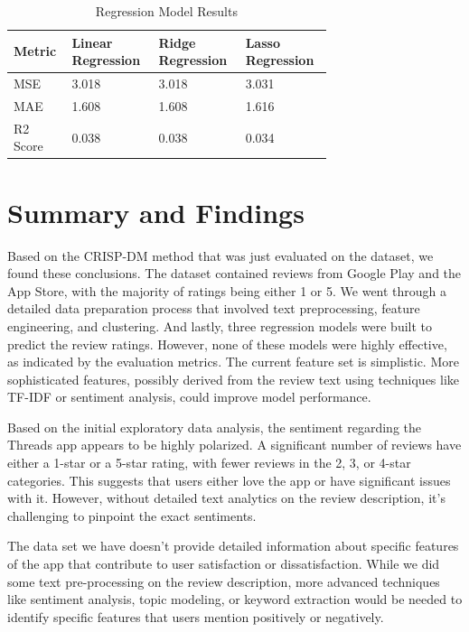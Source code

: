 \documentclass[
	a4paper, %
	10pt, %
	unnumberedsections, %
	twoside, %
]{LTJournalArticle}
\begin{document}
\begin{table} %
	\caption{Regression Model Results}
	\centering %
	\begin{tabular}{L{0.10\linewidth} R{0.2\linewidth} R{0.2\linewidth} R{0.2\linewidth}} %
		\toprule
		Metric & Linear Regression & Ridge Regression & Lasso Regression \\
		\midrule
		MSE & 3.018 & 3.018 & 3.031\\
         MAE & 1.608 & 1.608 & 1.616 \\
         R2 Score & 0.038 & 0.038 & 0.034\\
		\bottomrule
	\end{tabular}
\end{table}

\section{Summary and Findings}

Based on the CRISP-DM method that was just evaluated on the dataset, we found these conclusions. The dataset contained reviews from Google Play and the App Store, with the majority of ratings being either 1 or 5. We went through a detailed data preparation process that involved text preprocessing, feature engineering, and clustering. And lastly, three regression models were built to predict the review ratings. However, none of these models were highly effective, as indicated by the evaluation metrics. The current feature set is simplistic. More sophisticated features, possibly derived from the review text using techniques like TF-IDF or sentiment analysis, could improve model performance.

Based on the initial exploratory data analysis, the sentiment regarding the Threads app appears to be highly polarized. A significant number of reviews have either a 1-star or a 5-star rating, with fewer reviews in the 2, 3, or 4-star categories. This suggests that users either love the app or have significant issues with it. However, without detailed text analytics on the review description, it's challenging to pinpoint the exact sentiments.

The data set we have doesn't provide detailed information about specific features of the app that contribute to user satisfaction or dissatisfaction. While we did some text pre-processing on the review description, more advanced techniques like sentiment analysis, topic modeling, or keyword extraction would be needed to identify specific features that users mention positively or negatively.
\end{document}
